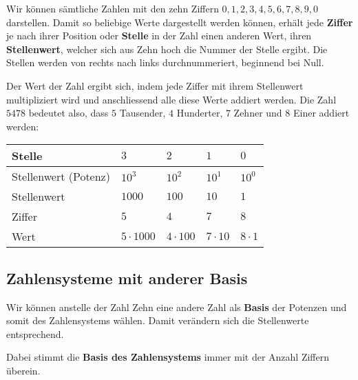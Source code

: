 Wir können sämtliche Zahlen mit den zehn Ziffern $0, 1, 2, 3, 4, 5, 6, 7, 8, 9, 0$ darstellen. Damit so beliebige Werte dargestellt werden können, erhält jede \textbf{Ziffer} je nach ihrer Position oder \textbf{Stelle} in der Zahl einen anderen Wert, ihren \textbf{Stellenwert}, welcher sich aus Zehn hoch die Nummer der Stelle ergibt. Die Stellen werden von rechts nach links durchnummeriert, beginnend bei Null.

Der Wert der Zahl ergibt sich, indem jede Ziffer mit ihrem Stellenwert multipliziert wird und anschliessend alle diese Werte addiert werden. Die Zahl $5478$ bedeutet also, dass $5$ Tausender, $4$ Hunderter, $7$ Zehner und $8$ Einer addiert werden:
\begin{center}
  \renewcommand{\arraystretch}{1}
  \begin{tabularx}{0.9\textwidth}{lCCCC}
  \toprule
    Stelle & $3$ & $2$ & $1$ & $0$ \\
  \midrule
    Stellenwert (Potenz) & $10^{3}$ & $10^{2}$ & $10^{1}$ & $10^{0}$ \\
  \midrule
    Stellenwert & $1000$ & $100$ & $10$ & $1$ \\
  \midrule
    Ziffer & $5$ & $4$ & $7$ & $8$ \\
  \midrule
    Wert & $5\cdot 1000$ & $4\cdot 100$ & $7\cdot 10$ & $8\cdot 1$ \\
  \bottomrule
  \end{tabularx}
\end{center}

\subsection{Zahlensysteme mit anderer Basis}

Wir können anstelle der Zahl Zehn eine andere Zahl als \textbf{Basis} der Potenzen und somit des Zahlensystems wählen. Damit verändern sich die Stellenwerte entsprechend.

Dabei stimmt die \textbf{Basis des Zahlensystems} immer mit der Anzahl Ziffern überein.

